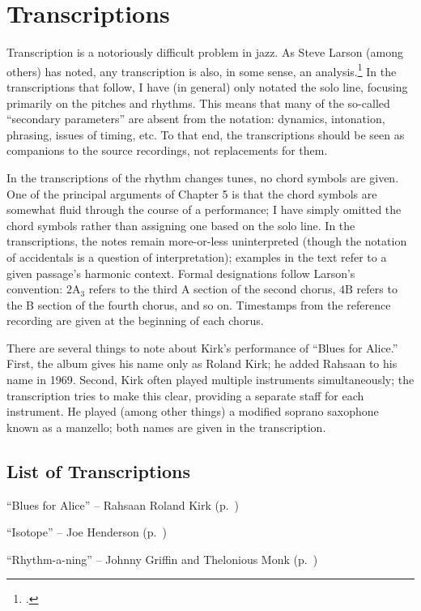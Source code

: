 \doublespacing
\chapter{Transcriptions}
\singlespacing

Transcription is a notoriously difficult problem in jazz. As Steve Larson
(among others) has noted, any transcription is also, in some sense, an
analysis.\footcite[2]{larson:2009} In the transcriptions that follow, I have
(in general) only notated the solo line, focusing primarily on the pitches and
rhythms. This means that many of the so-called ``secondary parameters'' are
absent from the notation: dynamics, intonation, phrasing, issues of timing,
etc. To that end, the transcriptions should be seen as companions to the
source recordings, not replacements for them.

In the transcriptions of the rhythm changes tunes, no chord symbols are given.
One of the principal arguments of Chapter 5 is that the chord symbols are
somewhat fluid through the course of a performance; I have simply omitted the
chord symbols rather than assigning one based on the solo line. In the
transcriptions, the notes remain more-or-less uninterpreted (though the
notation of accidentals is a question of interpretation); examples in the text
refer to a given passage's harmonic context. Formal designations follow
Larson's convention: $2\mathrm{A}_3$ refers to the third A section of the
second chorus, $4\mathrm{B}$ refers to the B section of the fourth chorus, and
so on. Timestamps from the reference recording are given at the beginning of
each chorus.

There are several things to note about Kirk's performance of ``Blues for
Alice.'' First, the album gives his name only as Roland Kirk; he added Rahsaan
to his name in 1969. Second, Kirk often played multiple instruments
simultaneously; the transcription tries to make this clear, providing a
separate staff for each instrument. He played (among other things) a modified
soprano saxophone known as a manzello; both names are given in the
transcription.

\section*{List of Transcriptions}

\begin{compactitem}
    \item ``Blues for Alice'' -- Rahsaan Roland Kirk
      (p.~\pageref{transcription:blues-for-alice})
    \item ``Isotope'' -- Joe Henderson (p.~\pageref{transcription:isotope})
    \item ``Rhythm-a-ning'' -- Johnny Griffin and Thelonious Monk
      (p.~\pageref{transcription:rhythm-a-ning})
\end{compactitem}
\nocite{henderson:isotope,monk:action,kirk:freekings}

